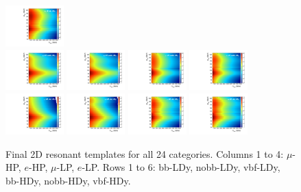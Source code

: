 \begin{figure}[htbp]
  \includegraphics[width=0.2\textwidth]{fig/2Dfit/template_res_e_LP_bb_HDy.pdf}\\
  \includegraphics[width=0.2\textwidth]{fig/2Dfit/template_res_mu_HP_nobb_HDy.pdf}
  \includegraphics[width=0.2\textwidth]{fig/2Dfit/template_res_e_HP_nobb_HDy.pdf}
  \includegraphics[width=0.2\textwidth]{fig/2Dfit/template_res_mu_LP_nobb_HDy.pdf}
  \includegraphics[width=0.2\textwidth]{fig/2Dfit/template_res_e_LP_nobb_HDy.pdf}\\
  \includegraphics[width=0.2\textwidth]{fig/2Dfit/template_res_mu_HP_vbf_HDy.pdf}
  \includegraphics[width=0.2\textwidth]{fig/2Dfit/template_res_e_HP_vbf_HDy.pdf}
  \includegraphics[width=0.2\textwidth]{fig/2Dfit/template_res_mu_LP_vbf_HDy.pdf}
  \includegraphics[width=0.2\textwidth]{fig/2Dfit/template_res_e_LP_vbf_HDy.pdf}\\
  \caption{
    Final 2D resonant templates for all 24 categories.
    Columns 1 to 4: $\mu$-HP, $e$-HP, $\mu$-LP, $e$-LP.
    Rows 1 to 6: bb-LDy, nobb-LDy, vbf-LDy, bb-HDy, nobb-HDy, vbf-HDy.
  }
  \label{fig:template_res_Run2}
\end{figure}

